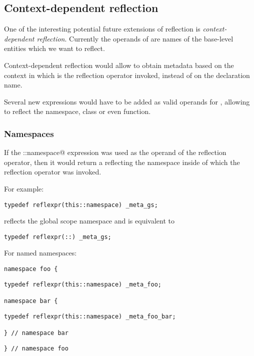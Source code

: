 \subsection{Context-dependent reflection}
\label{context-dependent-reflection}

One of the interesting potential future extensions of reflection
is {\em context-dependent reflection}. Currently the operands of \verb@reflexpr@
are names of the base-level entities which we want to reflect.

Context-dependent reflection would allow to obtain metadata based on the context
in which is the reflection operator invoked, instead of on the declaration name.

Several new expressions would have to be added as valid operands for
\verb@reflexpr@, allowing to reflect the  namespace, class
or even function.

\subsubsection{Namespaces}

If the \verb@this::namespace@ expression was used as the operand of the reflection
operator, then it would return a  reflecting the namespace
inside of which the reflection operator was invoked.

For example:

\begin{verbatim}
typedef reflexpr(this::namespace) _meta_gs;
\end{verbatim}

reflects the global scope namespace and is equivalent to

\begin{verbatim}
typedef reflexpr(::) _meta_gs;
\end{verbatim}

For named namespaces:

\begin{verbatim}
namespace foo {
\end{verbatim}
\begin{verbatim}
typedef reflexpr(this::namespace) _meta_foo;

namespace bar {
\end{verbatim}
\begin{verbatim}
typedef reflexpr(this::namespace) _meta_foo_bar;

} // namespace bar
\end{verbatim}
\begin{verbatim}
} // namespace foo
\end{verbatim}

